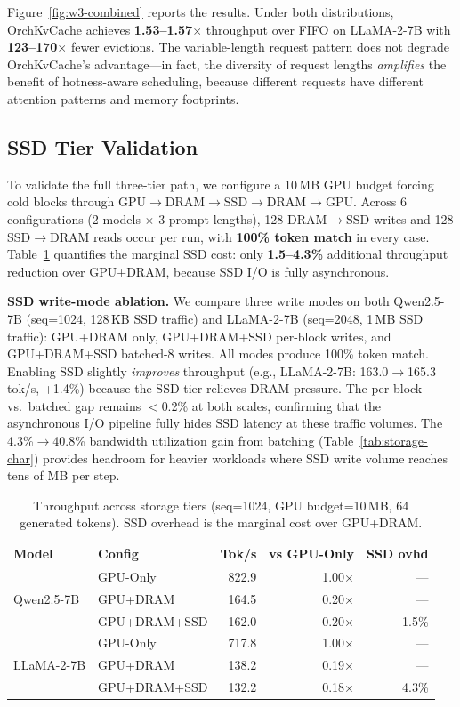 \documentclass[conference]{IEEEtran}
\begin{document}
Figure~\ref{fig:w3-combined} reports the results. Under both distributions, OrchKvCache achieves \textbf{1.53--1.57$\times$} throughput over FIFO on LLaMA-2-7B with \textbf{123--170$\times$} fewer evictions. The variable-length request pattern does not degrade OrchKvCache's advantage---in fact, the diversity of request lengths \emph{amplifies} the benefit of hotness-aware scheduling, because different requests have different attention patterns and memory footprints.

\subsection{SSD Tier Validation}
\label{sec:ssd-tier}

To validate the full three-tier path, we configure a 10\,MB GPU budget forcing cold blocks through GPU$\to$DRAM$\to$SSD$\to$DRAM$\to$GPU. Across 6 configurations (2 models $\times$ 3 prompt lengths), 128 DRAM$\to$SSD writes and 128 SSD$\to$DRAM reads occur per run, with \textbf{100\% token match} in every case. Table~\ref{tab:tier-throughput} quantifies the marginal SSD cost: only \textbf{1.5--4.3\%} additional throughput reduction over GPU+DRAM, because SSD I/O is fully asynchronous.

\textbf{SSD write-mode ablation.} We compare three write modes on both Qwen2.5-7B (seq=1024, 128\,KB SSD traffic) and LLaMA-2-7B (seq=2048, 1\,MB SSD traffic): GPU+DRAM only, GPU+DRAM+SSD per-block writes, and GPU+DRAM+SSD batched-8 writes. All modes produce 100\% token match. Enabling SSD slightly \emph{improves} throughput (e.g., LLaMA-2-7B: 163.0$\to$165.3\,tok/s, +1.4\%) because the SSD tier relieves DRAM pressure. The per-block vs.\ batched gap remains $<$0.2\% at both scales, confirming that the asynchronous I/O pipeline fully hides SSD latency at these traffic volumes. The 4.3\%$\to$40.8\% bandwidth utilization gain from batching (Table~\ref{tab:storage-char}) provides headroom for heavier workloads where SSD write volume reaches tens of MB per step.

\begin{table}[t]
\centering
\caption{Throughput across storage tiers (seq=1024, GPU budget=10\,MB, 64 generated tokens). SSD overhead is the marginal cost over GPU+DRAM.}
\label{tab:tier-throughput}
\footnotesize
\setlength{\tabcolsep}{4pt}
\begin{tabular}{@{}llrrr@{}}
\toprule
Model & Config & Tok/s & vs GPU-Only & SSD ovhd \\
\midrule
\multirow{3}{*}{Qwen2.5-7B}
& GPU-Only     & 822.9 & 1.00$\times$ & --- \\
& GPU+DRAM     & 164.5 & 0.20$\times$ & --- \\
& GPU+DRAM+SSD & 162.0 & 0.20$\times$ & 1.5\% \\
\midrule
\multirow{3}{*}{LLaMA-2-7B}
& GPU-Only     & 717.8 & 1.00$\times$ & --- \\
& GPU+DRAM     & 138.2 & 0.19$\times$ & --- \\
& GPU+DRAM+SSD & 132.2 & 0.18$\times$ & 4.3\% \\
\bottomrule
\end{tabular}
\end{table}
\end{document}
